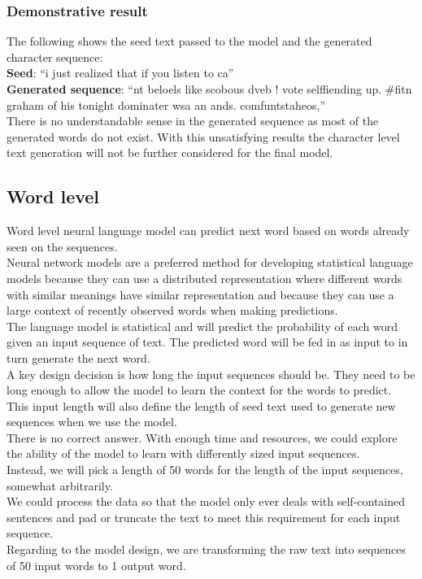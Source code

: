 \documentclass[conference]{IEEEtran}
\begin{document}
\subsubsection{Demonstrative result}\label{subsubsec_result_character}

The following shows the seed text passed to the model and the generated character sequence:\\

\textbf{Seed}: ``i just realized that if you listen to ca''\\
\textbf{Generated sequence}: ``nt beloels like scobous dveb ! vote selffiending up. \#fitn graham of his tonight dominater wsa an ands. comfuntstaheos,''\\

There is no understandable sense in the generated sequence as most of the generated words do not exist. With this unsatisfying results the character level text generation will not be further considered for the final model.

\subsection{Word level}

Word level neural language model can predict next word based on words already seen on the sequences.\\
Neural network models are a preferred method for developing statistical language models because they can use a distributed representation where different words with similar meanings have similar representation and because they can use a large context of recently observed words when making predictions.\\
The language model is statistical and will predict the probability of each word given an input sequence of text. The predicted word will be fed in as input to in turn generate the next word.\\
A key design decision is how long the input sequences should be. They need to be long enough to allow the model to learn the context for the words to predict. This input length will also define the length of seed text used to generate new sequences when we use the model.\\
There is no correct answer. With enough time and resources, we could explore the ability of the model to learn with differently sized input sequences.\\
Instead, we will pick a length of 50 words for the length of the input sequences, somewhat arbitrarily.\\
We could process the data so that the model only ever deals with self-contained sentences and pad or truncate the text to meet this requirement for each input sequence.\\
Regarding to the model design, we are transforming the raw text into sequences of 50 input words to 1 output word.\\
\end{document}
